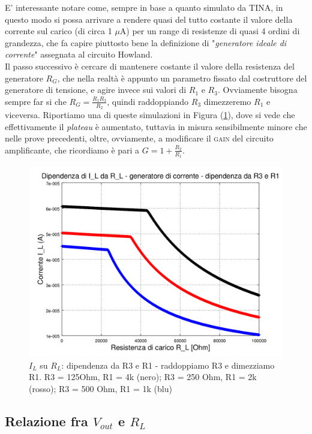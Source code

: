 \documentclass[journal, a4paper]{IEEEtran}
\begin{document}
E' interessante notare come, sempre in base a quanto simulato da TINA, in questo modo si possa arrivare a rendere quasi del tutto costante il valore della corrente sul carico (di circa 1 $\mu$A) per un range di resistenze di quasi 4 ordini di grandezza, che fa capire piuttosto bene la definizione di "\textit{generatore ideale di corrente}" assegnata al circuito Howland.\\
Il passo successivo è cercare di mantenere costante il valore della resistenza del generatore $R_G$, che nella realtà è appunto un parametro fissato dal costruttore del generatore di tensione, e agire invece sui valori di $R_1$ e $R_3$. Ovviamente bisogna sempre far si che $R_G = \frac{R_1 R_3 }{R_2}$, quindi raddoppiando $R_3$ dimezzeremo $R_1$ e viceversa. Riportiamo una di queste simulazioni in Figura (\ref{fig:corrente_carico_res_carico_R3_125-250-500_R1-4k-2k-1k_linear1}), dove si vede che effettivamente il \textit{plateau} è aumentato, tuttavia in misura sensibilmente minore che nelle prove precedenti, oltre, ovviamente, a modificare il \textsc{gain} del circuito amplificante, che ricordiamo è pari a $G = 1 + \frac{R_2}{R_1}$.\\

\begin{figure}
\centering
\includegraphics[width=0.7\linewidth]{./corrente_carico_res_carico_R3_125-250-500_R1-4k-2k-1k_linear1}
\caption{$I_L$ su $R_L$: dipendenza da R3 e R1 - raddoppiamo R3 e dimezziamo R1. R3 = 125Ohm, R1 = 4k (nero); R3 = 250 Ohm, R1 = 2k (rosso); R3 = 500 Ohm, R1 = 1k (blu)}
\label{fig:corrente_carico_res_carico_R3_125-250-500_R1-4k-2k-1k_linear1}
\end{figure}

\subsection{Relazione fra $V_{out}$ e $R_L$}
\end{document}
